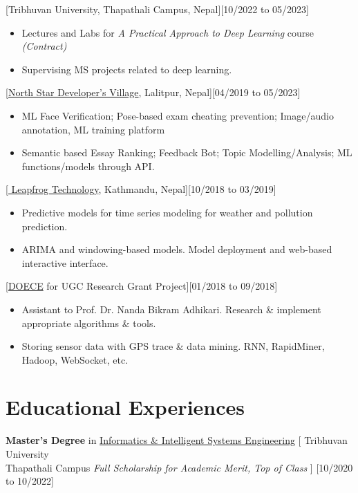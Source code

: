 \documentclass{resume}
\begin{document}
[Tribhuvan University, Thapathali Campus, Nepal][10/2022 to 05/2023]
\begin{itemize}
   \item Lectures and Labs for \textit{A Practical Approach to Deep Learning} course \textit{(Contract)}
   \item Supervising MS projects related to deep learning.
\end{itemize}

[\href{https://ublrandd.com.np/}{North Star Developer's Village}, Lalitpur, Nepal][04/2019 to  05/2023]
\begin{itemize}
   \item 	ML Face Verification; Pose-based exam cheating prevention; Image/audio annotation, ML training platform
   \item Semantic based Essay Ranking; Feedback Bot; Topic Modelling/Analysis; ML functions/models through API.
\end{itemize}

[\href{https://www.lftechnology.com/}{ Leapfrog Technology}, Kathmandu, Nepal][10/2018 to 03/2019]
\begin{itemize}
\item	Predictive models for time series modeling for weather and pollution prediction. 
\item ARIMA and windowing-based models. Model deployment and web-based interactive interface.
\end{itemize}

[\href{http://doece.pcampus.edu.np/}{DOECE} for UGC Research Grant Project][01/2018 to 09/2018]
\begin{itemize}
\item	Assistant to Prof. Dr. Nanda Bikram Adhikari. Research \& implement appropriate algorithms \& tools. 
\item Storing sensor data with GPS trace \& data mining. RNN, RapidMiner, Hadoop, WebSocket, etc. 

\end{itemize}



\section{Educational Experiences}
\ResumeItem
{\textbf{Master's Degree} 
 in \href{https://tcioe.edu.np/page/MSIISE}{Informatics \& Intelligent Systems Engineering}}
[  Tribhuvan University \\
Thapathali Campus \qquad \textit{Full Scholarship for Academic Merit, Top of Class}
]
[10/2020 to 10/2022]
\end{document}
